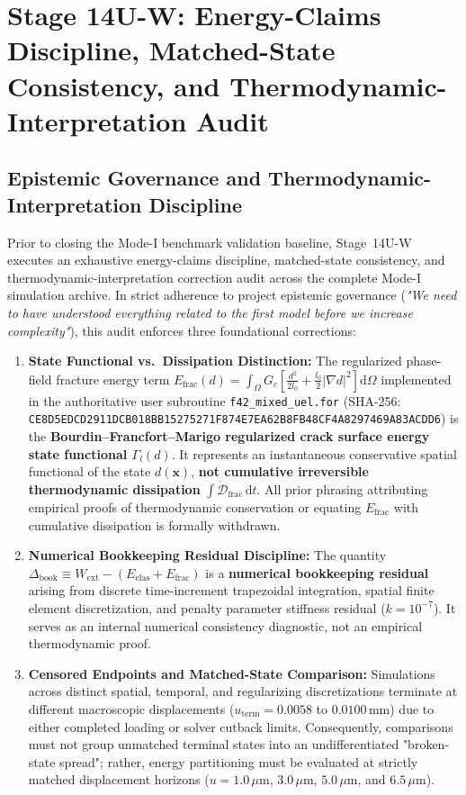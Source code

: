 \section{Stage 14U-W: Energy-Claims Discipline, Matched-State Consistency, and Thermodynamic-Interpretation Audit}
\label{sec:stage14uw_energy_claims_discipline}

\subsection{Epistemic Governance and Thermodynamic-Interpretation Discipline}
\label{subsec:stage14uw_motivation}

Prior to closing the Mode-I benchmark validation baseline, Stage~14U-W executes an exhaustive energy-claims discipline, matched-state consistency, and thermodynamic-interpretation correction audit across the complete Mode-I simulation archive. In strict adherence to project epistemic governance (\textit{"We need to have understood everything related to the first model before we increase complexity"}), this audit enforces three foundational corrections:
\begin{enumerate}
    \item \textbf{State Functional vs.\ Dissipation Distinction:} The regularized phase-field fracture energy term $E_{\mathrm{frac}}(d) = \int_\Omega G_c \left[ \frac{d^2}{2l_0} + \frac{l_0}{2} |\nabla d|^2 \right] \mathrm{d}\Omega$ implemented in the authoritative user subroutine \texttt{f42\_mixed\_uel.for} (SHA-256: \texttt{CE8D5EDCD2911DCB018BB15275271F874E7EA62B8FB48CF4A8297469A83ACDD6}) is the \textbf{Bourdin--Francfort--Marigo regularized crack surface energy state functional $\Gamma_l(d)$}. It represents an instantaneous conservative spatial functional of the state $d(\mathbf{x})$, \textbf{not cumulative irreversible thermodynamic dissipation} $\int \dot{\mathcal{D}}_{\mathrm{frac}}\,\mathrm{d}t$. All prior phrasing attributing empirical proofs of thermodynamic conservation or equating $E_{\mathrm{frac}}$ with cumulative dissipation is formally withdrawn.
    \item \textbf{Numerical Bookkeeping Residual Discipline:} The quantity $\Delta_{\mathrm{book}} \equiv W_{\mathrm{ext}} - (E_{\mathrm{elas}} + E_{\mathrm{frac}})$ is a \textbf{numerical bookkeeping residual} arising from discrete time-increment trapezoidal integration, spatial finite element discretization, and penalty parameter stiffness residual ($k = 10^{-7}$). It serves as an internal numerical consistency diagnostic, not an empirical thermodynamic proof.
    \item \textbf{Censored Endpoints and Matched-State Comparison:} Simulations across distinct spatial, temporal, and regularizing discretizations terminate at different macroscopic displacements ($u_{\mathrm{term}} = 0.0058$ to $0.0100\,\mathrm{mm}$) due to either completed loading or solver cutback limits. Consequently, comparisons must not group unmatched terminal states into an undifferentiated "broken-state spread"; rather, energy partitioning must be evaluated at strictly matched displacement horizons ($u = 1.0\,\mu\mathrm{m}$, $3.0\,\mu\mathrm{m}$, $5.0\,\mu\mathrm{m}$, and $6.5\,\mu\mathrm{m}$).
\end{enumerate}

